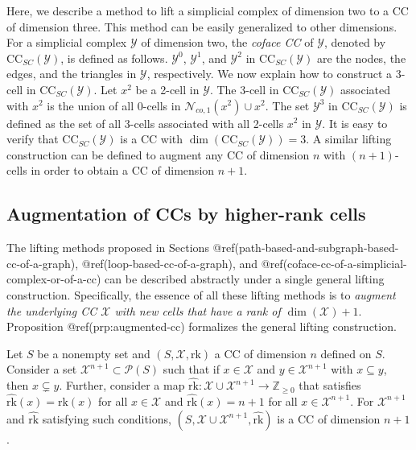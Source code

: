 \documentclass[
  12pt,
]{krantz}
\begin{document}
Here, we describe a method to lift a simplicial complex of dimension two
to a CC of dimension three. This method can be easily generalized to
other dimensions. For a simplicial complex \(\mathcal{Y}\) of dimension
two, the \emph{coface CC} of \(\mathcal{Y}\), denoted by
\(\mbox{CC}_{SC}( \mathcal{Y})\), is defined as follows.
\(\mathcal{Y}^0\), \(\mathcal{Y}^1\), and \(\mathcal{Y}^2\) in
\(\mbox{CC}_{SC}( \mathcal{Y})\) are the nodes, the edges, and the
triangles in \(\mathcal{Y}\), respectively. We now explain how to
construct a \(3\)-cell in \(\mbox{CC}_{SC}( \mathcal{Y})\). Let \(x^2\)
be a 2-cell in \(\mathcal{Y}\). The 3-cell in
\(\mbox{CC}_{SC}( \mathcal{Y})\) associated with \(x^2\) is the union of
all 0-cells in \(\mathcal{N}_{co,1}(x^2) \cup x^2\). The set
\(\mathcal{Y}^3\) in \(\mbox{CC}_{SC}( \mathcal{Y})\) is defined as the
set of all 3-cells associated with all 2-cells \(x^2\) in
\(\mathcal{Y}\). It is easy to verify that
\(\mbox{CC}_{SC}(\mathcal{Y})\) is a CC with
\(\dim(\mbox{CC}_{SC}(\mathcal{Y}) )=3\). A similar lifting construction
can be defined to augment any CC of dimension \(n\) with \((n+1)\)-cells
in order to obtain a CC of dimension \(n+1\).

\subsection{Augmentation of CCs by higher-rank
cells}\label{augmentation-of-ccs-by-higher-rank-cells}

The lifting methods proposed in Sections
@ref(path-based-and-subgraph-based-cc-of-a-graph),
@ref(loop-based-cc-of-a-graph), and
@ref(coface-cc-of-a-simplicial-complex-or-of-a-cc) can be described
abstractly under a single general lifting construction. Specifically,
the essence of all these lifting methods is to \emph{augment the
underlying CC \(\mathcal{X}\) with new cells that have a rank of
\(\dim(\mathcal{X})+1\)}. Proposition @ref(prp:augmented-cc) formalizes
the general lifting construction.

\label{augmented-cc}
Let \(S\) be a nonempty set and \((S,\mathcal{X},\mbox{rk})\) a CC of
dimension \(n\) defined on \(S\). Consider a set
\(\mathcal{X}^{n+1} \subset \mathcal{P}(S)\) such that if
\(x\in\mathcal{X}\) and \(y \in \mathcal{X}^{n+1}\) with
\(x\subseteq y\), then \(x\subsetneq y\). Further, consider a map
\(\hat{\mbox{rk}}\colon \mathcal{X}\cup \mathcal{X}^{n+1}\to \mathbb{Z}_{\ge 0}\)
that satisfies \(\hat{\mbox{rk}}(x)= \mbox{rk}(x)\) for all
\(x\in\mathcal{X}\) and \(\hat{\mbox{rk}}(x)=n+1\) for all
\(x \in \mathcal{X}^{n+1}\). For \(\mathcal{X}^{n+1}\) and
\(\hat{\mbox{rk}}\) satisfying such conditions,
\((S,\mathcal{X}\cup \mathcal{X}^{n+1},\hat{\mbox{rk}} )\) is a CC of
dimension \(n+1\).
\end{document}
